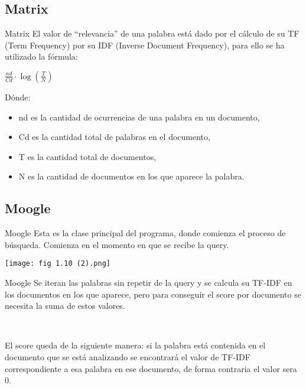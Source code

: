 \subsection{Matrix}
\begin{frame}{Matrix}
    El valor de “relevancia” de una palabra está dado por el cálculo de su TF (Term Frequency) por su IDF
(Inverse Document Frequency), para ello se ha utilizado la fórmula:

\begin{center}
	$\frac{nd}{Cd} \cdot \log (\frac{T}{N})$ \\
\end{center}

Dónde:
\

\begin{itemize}
    \item nd es la cantidad de ocurrencias de una palabra en un documento,
\pause 
    \item Cd es la cantidad total de palabras en el documento,
\pause
    \item T es la cantidad total de documentos,
\pause
    \item N es la cantidad de documentos en los que aparece la palabra.
\end{itemize}
\end{frame}

\subsection{Moogle}
\begin{frame}{Moogle}
    Esta es la clase principal del programa, donde comienza el proceso de búsqueda. Comienza en el momento
en que se recibe la query.

\pause

\begin{center}
	\texttt{[image: fig 1.10 (2).png]}\\
\end{center}
\end{frame}

\begin{frame}{Moogle}
    Se iteran las palabras sin repetir de la query y se calcula su TF-IDF en los
documentos en los que aparece, pero para conseguir el score por documento se necesita la suma de estos
valores.

\

El score queda de la siguiente manera: si la palabra está contenida en el documento que se está analizando se encontrará el valor de TF-IDF
correspondiente a esa palabra en ese documento, de forma contraria el valor sera 0.

\end{frame}